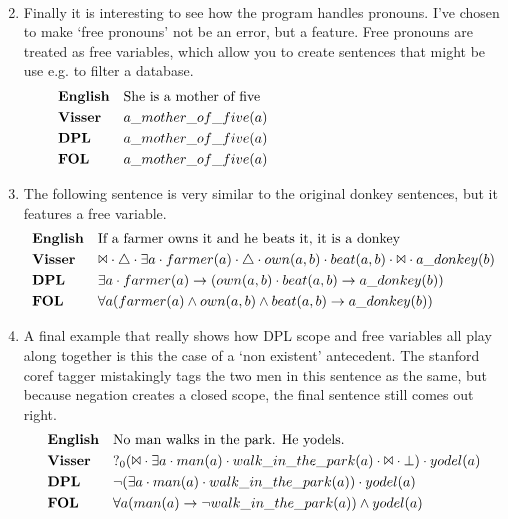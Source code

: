 \documentclass[12pt]{article}
\begin{document}
\begin{enumerate}
\begin{align*}
\end{align*}
\item
Finally it is interesting to see how the program handles pronouns. I've chosen to make `free pronouns' not be an error, but a feature. Free pronouns are treated as free variables, which allow you to create sentences that might be use e.g. to filter a database.
\begin{align*}
&\text{\textbf{English}}&&\text{She is a mother of five}\hspace{15em} \\
&\text{\textbf{Visser}}&&a\_mother\_of\_five(a) \\
&\text{\textbf{DPL}}&&a\_mother\_of\_five(a) \\
&\text{\textbf{FOL}}&&a\_mother\_of\_five(a) \\
\end{align*}
\item
The following sentence is very similar to the original donkey sentences, but it features a free variable.
\begin{align*}
&\text{\textbf{English}}&&\text{If a farmer owns it and he beats it, it is a donkey} \\
&\text{\textbf{Visser}}&&\Bowtie \cdot \triangle \cdot \exists a \cdot farmer(a) \cdot \triangle \cdot own(a,b) \cdot beat(a,b) \cdot \Bowtie \cdot a\_donkey(b) \\
&\text{\textbf{DPL}}&&\exists a \cdot farmer(a) \rightarrow (own(a,b) \cdot beat(a,b) \rightarrow a\_donkey(b)) \\
&\text{\textbf{FOL}}&&\forall a(farmer(a) \wedge own(a,b) \wedge beat(a,b) \rightarrow a\_donkey(b)) \\
\end{align*}
\item
A final example that really shows how DPL scope and free variables all play along together is this the case of a `non existent' antecedent. The stanford coref tagger mistakingly tags the two men in this sentence as the same, but because negation creates a closed scope, the final sentence still comes out right.
\begin{align*}
&\text{\textbf{English}}&&\text{No man walks in the park. He yodels.} \\
&\text{\textbf{Visser}}&&?_0(\Bowtie \cdot \exists a \cdot man(a) \cdot walk\_in\_the\_park(a) \cdot \Bowtie \cdot \bot) \cdot yodel(a) \\
&\text{\textbf{DPL}}&&\neg (\exists a \cdot man(a) \cdot walk\_in\_the\_park(a)) \cdot yodel(a) \\
&\text{\textbf{FOL}}&&\forall a(man(a) \rightarrow \neg walk\_in\_the\_park(a)) \wedge yodel(a) \\
\end{align*}

\end{enumerate}
\end{document}
